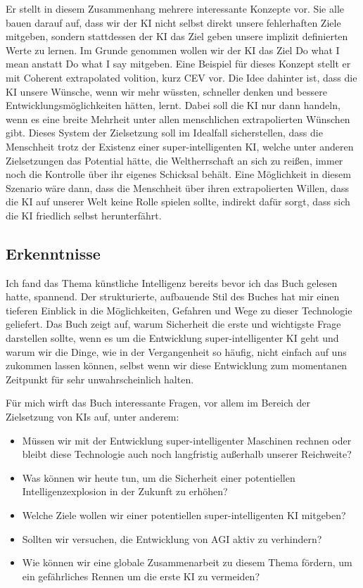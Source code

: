 \documentclass[twoside, a4paper, DIV=11, open=any, bibliography=totoc]{scrbook}
\newcommand{\Quote}[1]{\glqq #1\grqq{}}
\begin{document}
Er stellt in diesem Zusammenhang mehrere interessante Konzepte vor.
Sie alle bauen darauf auf, dass wir der KI nicht selbst direkt unsere fehlerhaften
Ziele mitgeben, sondern stattdessen der KI das Ziel geben unsere implizit definierten
Werte zu lernen. Im Grunde genommen wollen wir der KI das Ziel \Quote{Do what I mean}
anstatt \Quote{Do what I say} mitgeben.
Eine Beispiel für dieses Konzept stellt er mit \Quote{Coherent extrapolated volition},
kurz CEV vor. Die Idee dahinter ist, dass die KI unsere Wünsche, wenn wir mehr wüssten,
schneller denken und bessere Entwicklungsmöglichkeiten hätten, lernt.
Dabei soll die KI nur dann handeln, wenn es eine breite Mehrheit unter allen
menschlichen extrapolierten Wünschen gibt.
Dieses System der Zielsetzung soll im Idealfall sicherstellen, dass die Menschheit
trotz der Existenz einer super-intelligenten KI, welche unter anderen Zielsetzungen
das Potential hätte, die Weltherrschaft an sich zu reißen, immer noch die Kontrolle
über ihr eigenes Schicksal behält.
Eine Möglichkeit in diesem Szenario wäre dann, dass die Menschheit über ihren
extrapolierten Willen, dass die KI auf unserer Welt keine Rolle spielen sollte,
indirekt dafür sorgt, dass sich die KI friedlich selbst herunterfährt.

\subsection{Erkenntnisse} \label{sec:literkenntnis}

Ich fand das Thema künstliche Intelligenz bereits bevor ich das Buch gelesen hatte, spannend.
Der strukturierte, aufbauende Stil des Buches hat mir einen tieferen Einblick in
die Möglichkeiten, Gefahren und Wege zu dieser Technologie geliefert.
Das Buch zeigt auf, warum Sicherheit die erste und wichtigste Frage darstellen sollte,
wenn es um die Entwicklung super-intelligenter KI geht und warum wir die Dinge,
wie in der Vergangenheit so häufig, nicht einfach auf uns zukommen lassen können,
selbst wenn wir diese Entwicklung zum momentanen Zeitpunkt für sehr unwahrscheinlich halten.


Für mich wirft das Buch interessante Fragen, vor allem im Bereich der Zielsetzung von KIs auf,
unter anderem:

\begin{itemize}
  \item Müssen wir mit der Entwicklung super-intelligenter Maschinen rechnen oder
  bleibt diese Technologie auch noch langfristig außerhalb unserer Reichweite?
  \item Was können wir heute tun, um die Sicherheit einer potentiellen Intelligenzexplosion
  in der Zukunft zu erhöhen?
  \item Welche Ziele wollen wir einer potentiellen super-intelligenten KI mitgeben?
  \item Sollten wir versuchen, die Entwicklung von AGI aktiv zu verhindern?
  \item Wie können wir eine globale Zusammenarbeit zu diesem Thema fördern,
  um ein gefährliches Rennen um die erste KI zu vermeiden?
\end{itemize}
\end{document}
